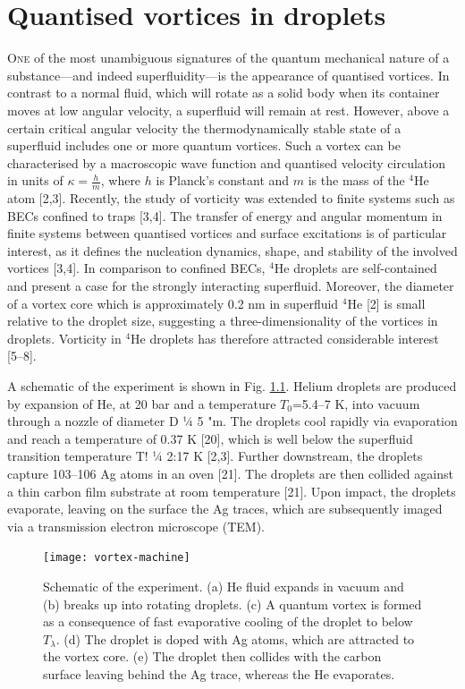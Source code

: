 \chapter{Quantised vortices in droplets}\label{sec:quant-vort}
	\lettrine[lines=4,findent=3pt,nindent=0pt]{\color{activeColor}O}{ne} of the most unambiguous signatures of the quantum mechanical nature of a substance---and indeed superfluidity---is the appearance of quantised vortices. In contrast to a normal fluid, which will rotate as a solid body when its container moves at low angular velocity, a superfluid will remain at rest. However, above a certain critical angular velocity the thermodynamically stable state of a superfluid includes one or more quantum vortices. Such a vortex can be characterised by a macroscopic wave function and quantised velocity circulation in units of $\kappa=\frac{h}{m}$, where $h$ is Planck’s constant and $m$ is the mass of the $^4$He atom [2,3]. Recently, the study of vorticity was extended to finite systems such as BECs confined to traps [3,4]. The transfer of energy and angular momentum in finite systems between quantised vortices and surface excitations is of particular interest, as it defines the nucleation dynamics, shape, and stability of the involved vortices [3,4]. In comparison to confined BECs, $^4$He droplets are self-contained and present a case for the strongly interacting superfluid. Moreover, the diameter of a vortex core which is approximately 0.2 nm in superfluid $^4$He [2] is small relative to the droplet size, suggesting a three-dimensionality of the vortices in droplets. Vorticity in $^4$He droplets has therefore attracted considerable interest [5–8].
	
	A schematic of the experiment is shown in Fig. \ref{fig:vortex-machine}. Helium droplets are produced by expansion of He, at 20 bar and a temperature $T_0$=5.4--7 K, into vacuum through a nozzle of diameter D 1⁄4 5 "m. The droplets cool rapidly via evaporation and reach a temperature of 0.37 K [20], which is well below the superfluid transition temperature T! 1⁄4 2:17 K [2,3]. Further downstream, the droplets capture 103–106 Ag atoms in an oven [21]. The droplets are then collided against a thin carbon film substrate at room temperature [21]. Upon impact, the droplets evaporate, leaving on the surface the Ag traces, which are subsequently imaged via a transmission electron microscope (TEM).
	\begin{figure}[t]
		\begin{center}
			\texttt{[image: vortex-machine]}
			\caption{Schematic of the experiment. (a) He fluid expands in vacuum and (b) breaks up into rotating droplets. (c) A quantum vortex is formed as a consequence of fast evaporative cooling of the droplet to below $T_\lambda$. (d) The droplet is doped with Ag atoms, which are attracted to the vortex core. (e) The droplet then collides with the carbon surface leaving behind the Ag trace, whereas the He evaporates.}
			\label{fig:vortex-machine}
		\end{center}
	\end{figure}	
	
